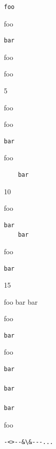 
\def\mytitle{Indented Code Blocks}


\begin{verbatim}
foo
\end{verbatim}

foo

\begin{verbatim}
bar
\end{verbatim}

foo

foo

5

foo

foo

\begin{verbatim}
bar
\end{verbatim}

foo

\begin{verbatim}
	bar
\end{verbatim}

10

foo

\begin{verbatim}
bar
	bar
\end{verbatim}

foo

\begin{verbatim}
bar
\end{verbatim}

15

foo
bar
bar

foo

\begin{verbatim}
bar
\end{verbatim}

foo

\begin{verbatim}
bar

bar

bar
\end{verbatim}

foo

\begin{verbatim}
-<>--&\&---...
\end{verbatim}


